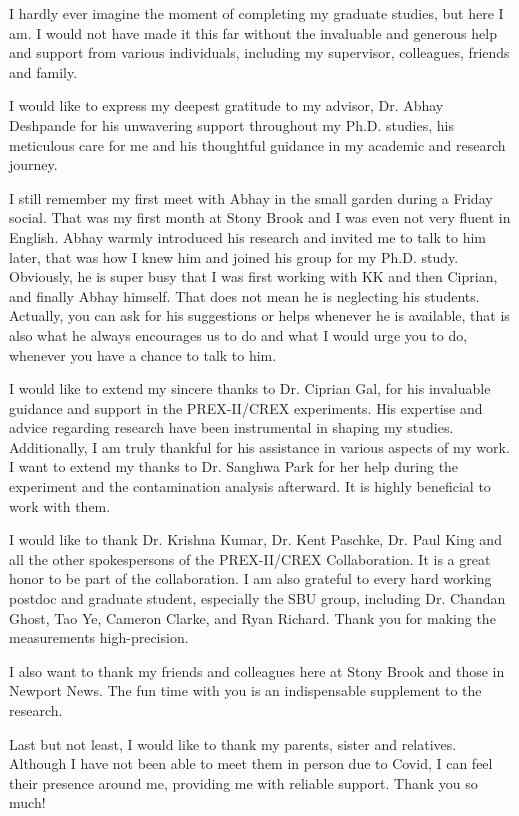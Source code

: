 I hardly ever imagine the moment of completing my graduate studies, but here I am. 
I would not have made it this far without the invaluable and generous help and support from various 
individuals, including my supervisor, colleagues, friends and family.

I would like to express my deepest gratitude to my advisor, Dr. Abhay Deshpande
for his unwavering support throughout my Ph.D. studies, his meticulous care for me 
and his thoughtful guidance in my academic and research journey.

I still remember my first meet with Abhay in the small garden during a Friday social.
That was my first month at Stony Brook and I was even not very fluent in English.
Abhay warmly introduced his research and invited me to talk to him later, that 
was how I knew him and joined his group for my Ph.D. study. Obviously, he is super busy 
that I was first working with KK and then Ciprian, and finally Abhay himself. 
That does not mean he is neglecting his students. Actually, you can ask for 
his suggestions or helps whenever he is available, that is also what he always 
encourages us to do and what I would urge you to do, whenever you have a chance to talk to him.

I would like to extend my sincere thanks to Dr. Ciprian Gal, for his 
invaluable guidance and support in the PREX-II/CREX experiments. His expertise 
and advice regarding research have been instrumental in shaping my studies. 
Additionally, I am truly thankful for his assistance in various aspects of my work.
I want to extend my thanks to Dr. Sanghwa Park for her help during the experiment
and the contamination analysis afterward. It is highly beneficial to
work with them.

I would like to thank Dr. Krishna Kumar, Dr. Kent Paschke, Dr. Paul King
and all the other spokespersons of the PREX-II/CREX Collaboration. It is a great honor
to be part of the collaboration. I am also grateful to every hard working postdoc and
graduate student, especially the SBU group, including Dr. Chandan Ghost, Tao Ye, Cameron 
Clarke, and Ryan Richard. Thank you for making the measurements high-precision.

I also want to thank my friends and colleagues here at Stony Brook and those in Newport News. 
The fun time with you is an indispensable supplement to the research.

Last but not least, I would like to thank my parents, sister and relatives.
Although I have not been able to meet them in person due to Covid, 
I can feel their presence around me, 
providing me with reliable support. Thank you so much!
